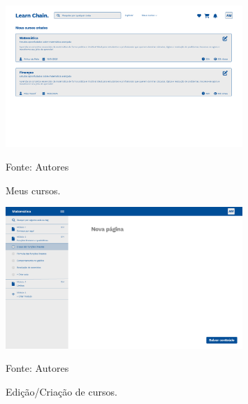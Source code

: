 \begin{apendicesenv}
    \begin{figure}[h]
        \centering
        \caption{Meus cursos.}
        \includegraphics[width=0.8\textwidth]{figuras/meus_cursos.png}
        \begin{center}
            {\footnotesize Fonte: Autores}
        \end{center}
        \label{fig:meus_cursos}
    \end{figure}

    \begin{figure}[h]
        \centering
        \caption{Edição/Criação de cursos.}
        \includegraphics[width=0.8\textwidth]{figuras/Criando_curso.png}
        \begin{center}
            {\footnotesize Fonte: Autores}
        \end{center}
        \label{fig:Criando_curso}
    \end{figure}


\end{apendicesenv}
